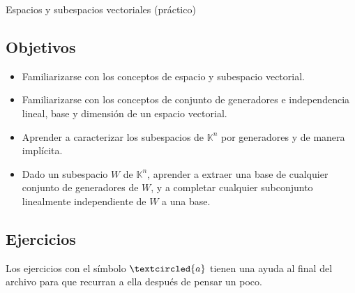 \begin{chapter}{Espacios y subespacios vectoriales (práctico)}\label{practico-1}



    

\subsection*{Objetivos}
    
\begin{itemize}
\item Familiarizarse con los conceptos de espacio y subespacio vectorial.
\item Familiarizarse con los conceptos de conjunto de generadores e independencia lineal, base y dimensión de un espacio vectorial.
        
\item Aprender a caracterizar los subespacios de $\mathbb K^n$ por generadores y de manera implícita.

\item Dado un subespacio $W$ de $\mathbb K^n$, aprender a extraer una base de cualquier conjunto de generadores de $W$, y a completar cualquier subconjunto linealmente independiente de $W$ a una base.

\end{itemize}
    

\subsection*{Ejercicios} Los ejercicios con el símbolo $\textcircled{a}$ tienen una ayuda al final del archivo para que recurran a ella después de pensar un poco.

\begin{enumerate}[topsep=6pt, itemsep=.4cm]

    



\end{enumerate}
\end{chapter}
